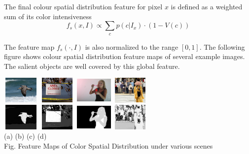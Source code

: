 \documentclass[10pt,twocolumn,letterpaper]{article}
\newcommand{\SUM}{\sum\limits}
\newcommand{\hs}{\hspace{0.58in}}
\begin{document}
The final colour spatial distribution feature for pixel $x$ is defined as a weighted sum of its color intensiveness $$f_s(x,I)\propto\SUM_c p(c|I_x)\cdot(1-V(c))$$

The feature map $f_s (\cdot,I)$ is also normalized to the range $[0, 1]$. The following figure shows colour spatial distribution feature maps of several example images. The salient objects are well covered by this global feature. 

    \begin{center}
    \includegraphics[width=0.72in,height=0.52in]{./CSD_image/1.jpg}
    \includegraphics[width=0.72in,height=0.52in]{./CSD_image/2.jpg}
    \includegraphics[width=0.72in,height=0.52in]{./CSD_image/3.jpg}
    \includegraphics[width=0.72in,height=0.52in]{./CSD_image/4.jpg}\\
    \includegraphics[width=0.72in,height=0.52in]{./CSD_image/1_CSD.jpg}
    \includegraphics[width=0.72in,height=0.52in]{./CSD_image/2_CSD.jpg}
    \includegraphics[width=0.72in,height=0.52in]{./CSD_image/3_CSD.jpg} 
    \includegraphics[width=0.72in,height=0.52in]{./CSD_image/4_CSD.jpg} \\
    \footnotesize \hspace{0.1cm} (a) \hs (b) \hs  (c) \hs (d) \\
     Fig. Feature Maps of Color Spatial Distribution under various scenes
    \end{center}
\end{document}
